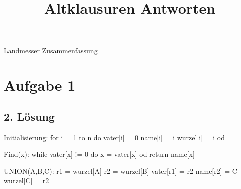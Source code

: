 \documentclass[10pt,a4paper]{article}
\title{Altklausuren Antworten}
\date{}
\begin{document}
	\maketitle
	 \href{https://github.com/ofenstichloch/Uni/blob/master/Kapitel\%20ADS/VL.pdf}{Landmesser Zusammenfassung}
	\section*{Aufgabe 1}
	\subsection{2. Lösung}
	Initialisierung:
	for i = 1 to n do
		vater[i] = 0
		name[i] = i
		wurzel[i] = i
	od
	
	Find(x):
	while vater[x] != 0 do
		x = vater[x]
	od
	return name[x]
	
	UNION(A,B,C):
	r1 = wurzel[A]
	r2 = wurzel[B]
	vater[r1] = r2
	name[r2] = C
	wurzel[C] = r2
\end{document}
